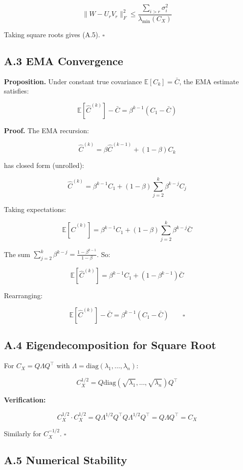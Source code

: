 \[
\|W - U_r V_r\|_F^2 \leq \frac{\sum_{i > r} \sigma_i^2}{\lambda_\text{min}(C_X)}
\tag{A.8}
\]

Taking square roots gives (A.5). $\square$

\subsection{A.3 EMA Convergence}

\textbf{Proposition.} Under constant true covariance $\mathbb{E}[C_k] = \bar{C}$, 
the EMA estimate satisfies:

\[
\mathbb{E}[\hat{C}^{(k)}] - \bar{C} = \beta^{k-1} (C_1 - \bar{C})
\tag{A.9}
\]

\textbf{Proof.} The EMA recursion:

\[
\hat{C}^{(k)} = \beta \hat{C}^{(k-1)} + (1-\beta) C_k
\]

has closed form (unrolled):

\[
\hat{C}^{(k)} = \beta^{k-1} C_1 + (1-\beta) \sum_{j=2}^{k} \beta^{k-j} C_j
\]

Taking expectations:

\[
\mathbb{E}[\hat{C}^{(k)}] = \beta^{k-1} C_1 + (1-\beta) \sum_{j=2}^{k} \beta^{k-j} \bar{C}
\]

The sum $\sum_{j=2}^{k} \beta^{k-j} = \frac{1 - \beta^{k-1}}{1 - \beta}$. So:

\[
\mathbb{E}[\hat{C}^{(k)}] = \beta^{k-1} C_1 + (1 - \beta^{k-1}) \bar{C}
\]

Rearranging:

\[
\mathbb{E}[\hat{C}^{(k)}] - \bar{C} = \beta^{k-1} (C_1 - \bar{C}) \qquad \square
\]

\subsection{A.4 Eigendecomposition for Square Root}

For $C_X = Q \Lambda Q^\top$ with $\Lambda = \mathrm{diag}(\lambda_1, \dots, \lambda_n)$:

\[
C_X^{1/2} = Q \mathrm{diag}(\sqrt{\lambda_1}, \dots, \sqrt{\lambda_n}) Q^\top
\tag{A.10}
\]

\textbf{Verification:}

\[
C_X^{1/2} \cdot C_X^{1/2} = Q \Lambda^{1/2} Q^\top Q \Lambda^{1/2} Q^\top = Q \Lambda Q^\top = C_X
\tag{A.11}
\]

Similarly for $C_X^{-1/2}$. $\square$

\subsection{A.5 Numerical Stability}


